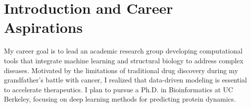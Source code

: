 \section{Introduction and Career Aspirations}
My career goal is to lead an academic research group developing computational tools that integrate machine learning and structural biology to address complex diseases. Motivated by the limitations of traditional drug discovery during my grandfather's battle with cancer, I realized that data-driven modeling is essential to accelerate therapeutics. I plan to pursue a Ph.D. in Bioinformatics at UC Berkeley, focusing on deep learning methods for predicting protein dynamics.
